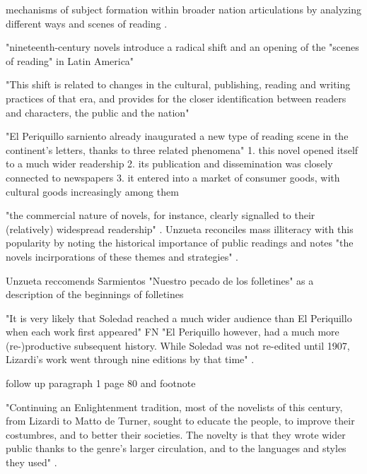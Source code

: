mechanisms of subject formation within broader nation articulations by analyzing different ways and scenes of reading \cite[75]{Unzueta2002}.

"nineteenth-century novels introduce a radical shift and an opening of the "scenes of reading" in Latin America" \cite[78]{Unzueta...}

"This shift is related to changes in the cultural, publishing, reading and writing practices of that era, and provides for the closer identification between readers and characters, the public and the nation" \cite[78]{Unzueta}


"El Periquillo sarniento already inaugurated a new type of reading scene in the continent's letters, thanks to three related phenomena"
1. this novel opened itself to a much wider readership
2. its publication and dissemination was closely connected to newspapers
3. it entered into a market of consumer goods, with cultural goods increasingly among them

"the commercial nature of novels, for instance, clearly signalled to their (relatively) widespread readership" \cite[79]{Unzueta2002}.
Unzueta reconciles mass illiteracy with this popularity by noting the historical importance of public readings
and notes "the novels incirporations of these themes and strategies" \cite[79]{Unzueta2002}.

Unzueta reccomends Sarmientos "Nuestro pecado de los folletines" as a description of the beginnings of folletines

"It is very likely that Soledad reached a much wider audience than El Periquillo when each work first appeared"
FN "El Periquillo however, had a much more (re-)productive subsequent history. While Soledad was not re-edited until 1907, Lizardi's work went through nine editions by that time" \cite[79]{Unzueta2002}.

follow up paragraph 1 page 80 and footnote

"Continuing an Enlightenment tradition, most of the novelists of this century, from Lizardi to Matto de Turner, sought to educate the people, to improve their costumbres, and to better their societies. The novelty is that they wrote wider public thanks to the genre's larger circulation, and to the languages and styles they used" \cite[80]{Unzueta2002}.

